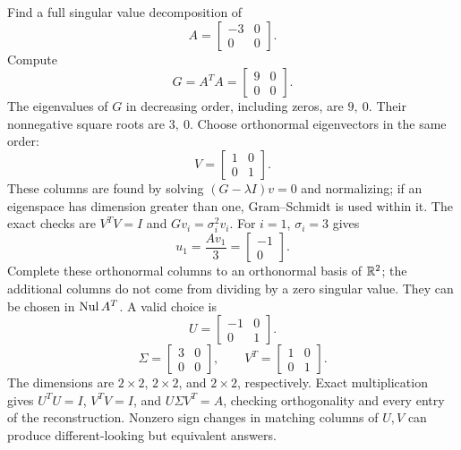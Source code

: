 \goal Find a full singular value decomposition of
\[A=\begin{bmatrix}-3&0\\0&0\end{bmatrix}.\]
Compute
\[G=A^TA=\begin{bmatrix}9&0\\0&0\end{bmatrix}.\]
The eigenvalues of $G$ in decreasing order, including zeros, are $9,\ 0$. Their nonnegative square roots are $3,\ 0$. Choose orthonormal eigenvectors in the same order:
\[V=\begin{bmatrix}1&0\\0&1\end{bmatrix}.\]
These columns are found by solving $(G-\lambda I)v=0$ and normalizing; if an eigenspace has dimension greater than one, Gram--Schmidt is used within it. The exact checks are $V^TV=I$ and $Gv_i=\sigma_i^2v_i$.
For $i=1$, $\sigma_i=3$ gives
\[u_{1}=\frac{Av_{1}}{3}=\begin{bmatrix}-1\\0\end{bmatrix}.\]
Complete these orthonormal columns to an orthonormal basis of $\mathbb{R}^{2}$; the additional columns do not come from dividing by a zero singular value. They can be chosen in $\operatorname{Nul} A^T$.
A valid choice is
\[U=\begin{bmatrix}-1&0\\0&1\end{bmatrix}.\]
\[\Sigma=\begin{bmatrix}3&0\\0&0\end{bmatrix},\qquad V^T=\begin{bmatrix}1&0\\0&1\end{bmatrix}.\]
The dimensions are $2\times2$, $2\times2$, and $2\times2$, respectively. Exact multiplication gives $U^TU=I$, $V^TV=I$, and $U\Sigma V^T=A$, checking orthogonality and every entry of the reconstruction. Nonzero sign changes in matching columns of $U,V$ can produce different-looking but equivalent answers.


